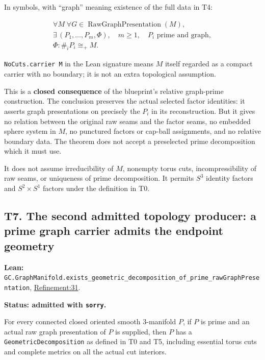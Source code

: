 \documentclass[
  letterpaper,
  11pt]{article}
\begin{document}
In symbols, with ``graph'' meaning existence of the full data in T4:

\[
\begin{gathered}
 \forall M\;\forall G\in\operatorname{RawGraphPresentation}(M),\\
 \exists\,(P_1,\ldots,P_m,\Phi),\quad
 m\geq1,\quad P_i\text{ prime and graph},\\
 \Phi:\#_iP_i\cong_+M.
\end{gathered}
\]

{\small\texttt{No\allowbreak{}Cuts.\allowbreak{}carrier M}} in the Lean
signature means \(M\) itself regarded as a compact carrier with no
boundary; it is not an extra topological assumption.

This is a \textbf{closed consequence} of the blueprint's relative
graph-prime construction. The conclusion preserves the actual selected
factor identities: it asserts graph presentations on precisely the
\(P_i\) in its reconstruction. But it gives no relation between the
original raw seams and the factor seams, no embedded sphere system in
\(M\), no punctured factors or cap-ball assignments, and no relative
boundary data. The theorem does not accept a preselected prime
decomposition which it must use.

It does not assume irreducibility of \(M\), nonempty torus cuts,
incompressibility of raw seams, or uniqueness of prime decomposition. It
permits \(S^3\) identity factors and \(S^2\times S^1\) factors under the
definition in T0.

\subsection{T7. The second admitted topology producer: a prime graph
carrier admits the endpoint geometry}\label{t7}

\textbf{Lean:}
{\small\texttt{GC.\allowbreak{}Graph\allowbreak{}Manifold.\allowbreak{}exists\_\allowbreak{}geometric\_\allowbreak{}decomposition\_\allowbreak{}of\_\allowbreak{}prime\_\allowbreak{}raw\allowbreak{}Graph\allowbreak{}Presentation}},
\href{https://github.com/qinz1yang/differential-geometry-dev/blob/ea0fae60ee01ef8c8d9b57a51794c6538f679c5d/DifferentialGeometry/Topology/ThreeManifold/GraphManifold/Refinement.lean\#L31}{Refinement:31}.

\textbf{Status: admitted with {\small\texttt{sorry}}.}

For every connected closed oriented smooth 3-manifold \(P\), if \(P\) is
prime and an actual raw graph presentation of \(P\) is supplied, then
\(P\) has a {\small\texttt{Geometric\allowbreak{}Decomposition}} as
defined in T0 and T5, including essential torus cuts and complete
metrics on all the actual cut interiors.
\end{document}
